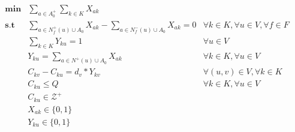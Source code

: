 \begin{align*}
    \mathbf{min} &\sum_{a\in A_0^+} \sum_{k \in K} {X_{ak}} \\
   \mathbf{s.t} &\sum_{a\in N_f^+(u) \cup A_0}{X_{ak}} - \sum_{a\in N_f^-(u) \cup A_0}{X_{ak}} = 0 & \forall k \in K, \forall u \in V, \forall f \in F \\
        &\sum_{k \in K}{Y_{ku}=1} & \forall u \in V\\
        &Y_{ku} = \sum_{a\in N^+(u) \cup A_0}{X_{ak}} & \forall k \in K, \forall u \in V\\
        &C_{kv} - C_{ku} = d_v * Y_{kv} & \forall (u,v) \in V, \forall k \in K\\
        &C_{ku} \leq Q & \forall k \in K, \forall u \in V \\
        &C_{ku} \in \mathcal{Z^+} \\
        &X_{ak} \in \{0,1\} \\
        &Y_{ku} \in \{0,1\}
\end{align*}